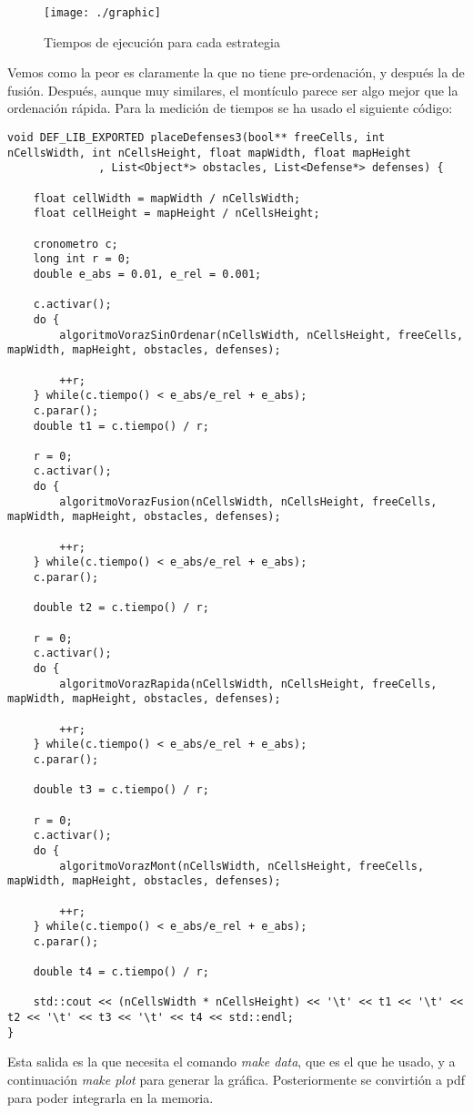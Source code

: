 \begin{figure}[h]
\centering
\texttt{[image: ./graphic]}
\caption{Tiempos de ejecución para cada estrategia}
\label{fig:defenseValueCellsHead}
\end{figure}

Vemos como la peor es claramente la que no tiene pre-ordenación, y después la de fusión. Después, aunque muy similares, el montículo parece ser algo mejor que la ordenación rápida. Para la medición de tiempos se ha usado el siguiente código:

\begin{lstlisting}
void DEF_LIB_EXPORTED placeDefenses3(bool** freeCells, int nCellsWidth, int nCellsHeight, float mapWidth, float mapHeight
              , List<Object*> obstacles, List<Defense*> defenses) {

    float cellWidth = mapWidth / nCellsWidth;
    float cellHeight = mapHeight / nCellsHeight; 

	cronometro c;
    long int r = 0;
    double e_abs = 0.01, e_rel = 0.001;

    c.activar();
    do {
		algoritmoVorazSinOrdenar(nCellsWidth, nCellsHeight, freeCells, mapWidth, mapHeight, obstacles, defenses);
		
		++r;
    } while(c.tiempo() < e_abs/e_rel + e_abs);
    c.parar();
    double t1 = c.tiempo() / r;

    r = 0;
    c.activar();
    do {
	    algoritmoVorazFusion(nCellsWidth, nCellsHeight, freeCells, mapWidth, mapHeight, obstacles, defenses);
		
		++r;
    } while(c.tiempo() < e_abs/e_rel + e_abs);
    c.parar();

    double t2 = c.tiempo() / r;

    r = 0;
    c.activar();
    do {
		algoritmoVorazRapida(nCellsWidth, nCellsHeight, freeCells, mapWidth, mapHeight, obstacles, defenses);
		
		++r;
    } while(c.tiempo() < e_abs/e_rel + e_abs);
    c.parar();

    double t3 = c.tiempo() / r;

    r = 0;
    c.activar();
    do {
		algoritmoVorazMont(nCellsWidth, nCellsHeight, freeCells, mapWidth, mapHeight, obstacles, defenses);

		++r;
    } while(c.tiempo() < e_abs/e_rel + e_abs);
    c.parar();

    double t4 = c.tiempo() / r;

    std::cout << (nCellsWidth * nCellsHeight) << '\t' << t1 << '\t' << t2 << '\t' << t3 << '\t' << t4 << std::endl;
}
\end{lstlisting}

Esta salida es la que necesita el comando \emph{make data}, que es el que he usado, y a continuación \emph{make plot} para generar la gráfica. Posteriormente se convirtión a pdf para poder integrarla en la memoria.
